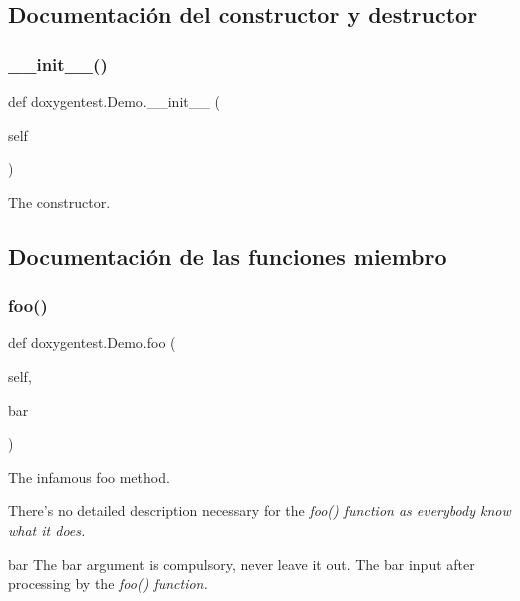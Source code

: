 \subsection{Documentación del constructor y destructor}
\mbox{\label{classdoxygentest_1_1_demo_ac9f60f8eb2c6f16f8ad7e95b0be53754}} 
\subsubsection{\texorpdfstring{\+\_\+\+\_\+init\+\_\+\+\_\+()}{\_\_init\_\_()}}
{\footnotesize\ttfamily def doxygentest.\+Demo.\+\_\+\+\_\+init\+\_\+\+\_\+ (\begin{DoxyParamCaption}\item[{}]{self }\end{DoxyParamCaption})}

\begin{DoxyVerb}The constructor.\end{DoxyVerb}
 

\subsection{Documentación de las funciones miembro}
\mbox{\label{classdoxygentest_1_1_demo_a2448af40a2cda534a3e299b0b355656b}} 
\subsubsection{\texorpdfstring{foo()}{foo()}}
{\footnotesize\ttfamily def doxygentest.\+Demo.\+foo (\begin{DoxyParamCaption}\item[{}]{self,  }\item[{}]{bar }\end{DoxyParamCaption})}

\begin{DoxyVerb}The infamous foo method.

There's no detailed description necessary for the \em foo()
function as everybody know what it does.

\param bar The \a bar argument is compulsory, never leave it out.
\return The \a bar input after processing by the \em foo() function.
\end{DoxyVerb}
 \mbox{\label{classdoxygentest_1_1_demo_a7f975bf8d98dc2400e3b9c696562926c}} 
